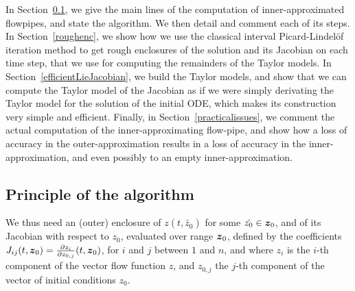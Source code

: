 \documentclass{sig-alternate-05-2015} %
\begin{document}
In Section~\ref{principle}, we give the main lines of the computation of inner-approximated flowpipes, 
and state the algorithm. We then detail and comment each of its steps. In Section~\ref{roughenc}, we
show how we use the classical interval Picard-Lindel\"of iteration method to get rough
enclosures of the solution and its Jacobian  on each time step, that we use for computing the remainders of the Taylor models.
In Section~\ref{efficientLieJacobian}, we build the Taylor models, and show that  we can compute
the Taylor model of the Jacobian as if we were simply derivating the Taylor model for the solution of the initial ODE, 
which makes its construction very simple and efficient. Finally, in Section~\ref{practicalissues}, we comment the actual 
computation of the inner-approximating flow-pipe, and show how a loss of accuracy in the outer-approximation results in 
a loss of accuracy in the inner-approximation, and even possibly to an empty inner-approximation.





\subsection{Principle of the algorithm}

\label{principle}

We thus need an (outer) enclosure of $z(t,\tilde{z_0})$ for some $\tilde{z_0} \in \z_0$, and of its Jacobian with respect to $z_0$, evaluated over range $\z_0$, 
defined by the coefficients $J_{ij}(t,\z_0)=\frac{\partial z_i}{\partial z_{0,j}}(t,\z_0)$, for $i$ and $j$ between $1$ and $n$, and where $z_i$ is the $i$-th 
component of the vector flow function $z$, and $z_{0,j}$ the $j$-th component of the vector of initial conditions $z_0$. 
\end{document}
